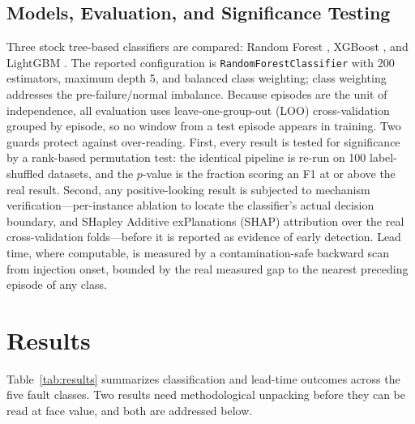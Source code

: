 \documentclass[conference]{IEEEtran}
\begin{document}
\subsection{Models, Evaluation, and Significance Testing}
Three stock tree-based classifiers are compared: Random Forest \cite{breiman2001}, XGBoost \cite{chen2016}, and LightGBM \cite{ke2017}. The reported configuration is \texttt{RandomForestClassifier} with 200 estimators, maximum depth 5, and balanced class weighting; class weighting addresses the pre-failure/normal imbalance. Because episodes are the unit of independence, all evaluation uses leave-one-group-out (LOO) cross-validation grouped by episode, so no window from a test episode appears in training. Two guards protect against over-reading. First, every result is tested for significance by a rank-based permutation test: the identical pipeline is re-run on 100 label-shuffled datasets, and the $p$-value is the fraction scoring an F1 at or above the real result. Second, any positive-looking result is subjected to mechanism verification---per-instance ablation to locate the classifier's actual decision boundary, and SHapley Additive exPlanations (SHAP) \cite{lundberg2017} attribution over the real cross-validation folds---before it is reported as evidence of early detection. Lead time, where computable, is measured by a contamination-safe backward scan from injection onset, bounded by the real measured gap to the nearest preceding episode of any class.

\section{Results}\label{sec:results}
Table~\ref{tab:results} summarizes classification and lead-time outcomes across the five fault classes. Two results need methodological unpacking before they can be read at face value, and both are addressed below.
\end{document}
